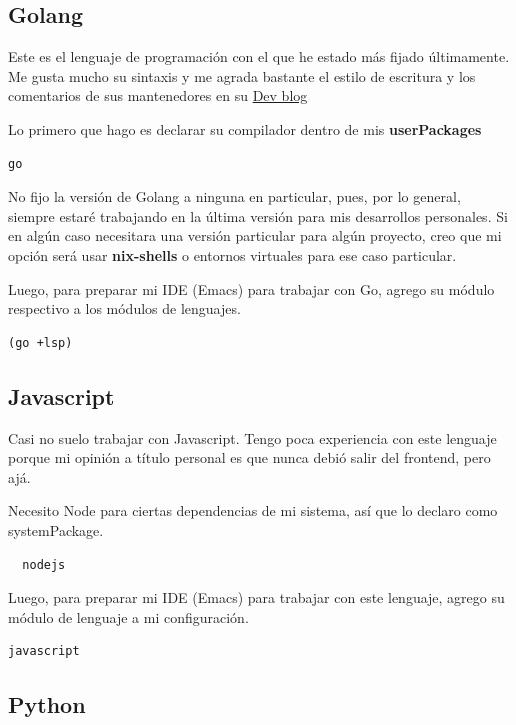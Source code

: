 \documentclass[11pt]{article}
\begin{document}
\subsection{Golang}
\label{sec:org5ce8fd1}

Este es el lenguaje de programación con el que he estado más fijado últimamente. Me gusta mucho su sintaxis y me agrada bastante el estilo de escritura y los comentarios de sus mantenedores en su \href{https://go.dev/blog/}{Dev blog}

Lo primero que hago es declarar su compilador dentro de mis \textbf{userPackages}

\begin{verbatim}
go
\end{verbatim}

No fijo la versión de Golang a ninguna en particular, pues, por lo general, siempre estaré trabajando en la última versión para mis desarrollos personales. Si en algún caso necesitara una versión particular para algún proyecto, creo que mi opción será usar \textbf{nix-shells} o entornos virtuales para ese caso particular.

Luego, para preparar mi IDE (Emacs) para trabajar con Go, agrego su módulo respectivo a los módulos de lenguajes.

\begin{verbatim}
(go +lsp)
\end{verbatim}
\subsection{Javascript}
\label{sec:org76a2b51}

Casi no suelo trabajar con Javascript. Tengo poca experiencia con este lenguaje porque mi opinión a título personal es que nunca debió salir del frontend, pero ajá.

Necesito Node para ciertas dependencias de mi sistema, así que lo declaro como systemPackage.

\begin{verbatim}
  nodejs
\end{verbatim}

Luego, para preparar mi IDE (Emacs) para trabajar con este lenguaje, agrego su módulo de lenguaje a mi configuración.

\begin{verbatim}
javascript
\end{verbatim}
\subsection{Python}
\label{sec:org0259aa9}
\end{document}
